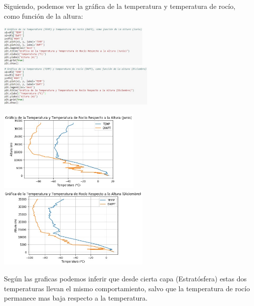 \documentclass[12pt]{article}
\begin{document}
Siguiendo, podemos ver la gráfica de la temperatura y temperatura de rocío, como función de la altura:
\begin{center}
	\includegraphics[height=2cm]{dj3.jpg} \hspace*{\fill}
    \includegraphics[height=2cm]{dd3.jpg}
\end{center}
\begin{center}
	\includegraphics[height=4cm]{gj3.jpg}  \hspace*{\fill}
    \includegraphics[height=4cm]{gd3.jpg}
\end{center}
Según las graficas podemos inferir que desde cierta capa (Estratósfera) estas dos temperaturas llevan el mismo comportamiento, salvo que la temperatura de rocío permanece mas baja respecto a la temperatura.\\
\end{document}
